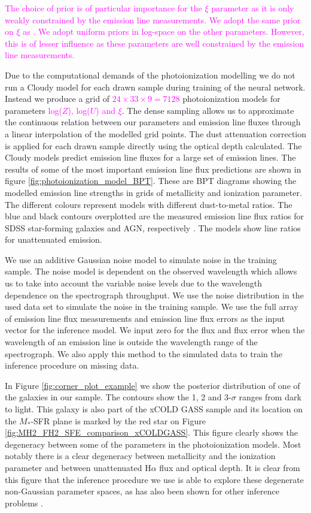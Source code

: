 \documentclass[fleqn,usenatbib]{mnras}
\begin{document}
\textcolor{magenta}{The choice of prior is of particular importance for the $\xi$ parameter as it is only weakly constrained by the emission line measurements. We adopt the same prior on $\xi$ as \cite{brinchmann2013}. We adopt uniform priors in log-space on the other parameters. However, this is of lesser influence as these parameters are well constrained by the emission line measurements.}

Due to the computational demands of the photoionization modelling we do not run a Cloudy model for each drawn sample during training of the neural network. Instead we produce a grid of \textcolor{magenta}{$24 \times 33 \times 9 = 7128$} photoionization models for parameters \textcolor{magenta}{log($Z$), log($U$) and $\xi$}. The dense sampling allows us to approximate the continuous relation between our parameters and emission line fluxes through a linear interpolation of the modelled grid points. The dust attenuation correction is applied for each drawn sample directly using the optical depth calculated. The Cloudy models predict emission line fluxes for a large set of emission lines. The results of some of the most important emission line flux predictions are shown in figure \ref{fig:photoionization_model_BPT}. These are BPT diagrams \citep{baldwin1981} showing the modelled emission line strengths in grids of metallicity and ionization parameter. The different colours represent models with different dust-to-metal ratios. The blue and black contours overplotted are the measured emission line flux ratios for SDSS star-forming galaxies and AGN, respectively \citep{brinchmann2004, kauffmann2003, tremonti2004}. The models show line ratios for unattenuated emission.

We use an additive Gaussian noise model to simulate noise in the training sample. The noise model is dependent on the observed wavelength which allows us to take into account the variable noise levels due to the wavelength dependence on the spectrograph throughput. We use the noise distribution in the used data set to simulate the noise in the training sample. We use the full array of emission line flux measurements and emission line flux errors as the input vector for the inference model. We input zero for the flux and flux error when the wavelength of an emission line is outside the wavelength range of the spectrograph. We also apply this method to the simulated data to train the inference procedure on missing data. 

In Figure \ref{fig:corner_plot_example} we show the posterior distribution of one of the galaxies in our sample. The contours show the 1, 2 and 3-$\sigma$ ranges from dark to light. This galaxy is also part of the xCOLD GASS sample and its location on the $M_{*}$-SFR plane is marked by the red star on Figure \ref{fig:MH2_FH2_SFE_comparison_xCOLDGASS}. This figure clearly shows the degeneracy between some of the parameters in the photoionization models. Most notably there is a clear degeneracy between metallicity and the ionization parameter and between unattenuated H$\alpha$ flux and optical depth. It is clear from this figure that the inference procedure we use is able to explore these degenerate non-Gaussian parameter spaces, as has also been shown for other inference problems \citep{greenberg2019}.
\end{document}
